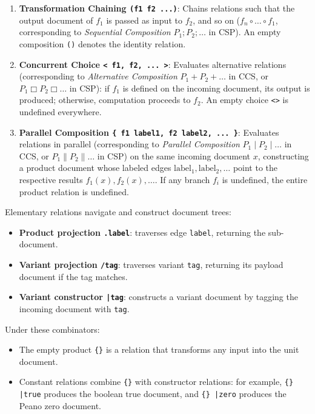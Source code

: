 \documentclass[11pt,a4paper]{article}
\begin{document}
\begin{enumerate}
  \item \textbf{Transformation Chaining \texttt{(f1 f2 ...)}}: Chains relations such that the output document of $f_1$ is passed as input to $f_2$, and so on ($f_n \circ \dots \circ f_1$, corresponding to \emph{Sequential Composition} $P_1 ; P_2 ; \dots$ in CSP). An empty composition \lstinline|()| denotes the identity relation.
  
  \item \textbf{Concurrent Choice \texttt{< f1, f2, ... >}}: Evaluates alternative relations (corresponding to \emph{Alternative Composition} $P_1 + P_2 + \dots$ in CCS, or $P_1 \Box P_2 \Box \dots$ in CSP): if $f_1$ is defined on the incoming document, its output is produced; otherwise, computation proceeds to $f_2$. An empty choice \lstinline|<>| is undefined everywhere.
  
  \item \textbf{Parallel Composition \texttt{\{ f1 label1, f2 label2, ... \}}}: Evaluates relations in parallel (corresponding to \emph{Parallel Composition} $P_1 \mid P_2 \mid \dots$ in CCS, or $P_1 \parallel P_2 \parallel \dots$ in CSP) on the same incoming document $x$, constructing a product document whose labeled edges $\text{label}_1, \text{label}_2, \dots$ point to the respective results $f_1(x), f_2(x), \dots$. If any branch $f_i$ is undefined, the entire product relation is undefined.
\end{enumerate}

Elementary relations navigate and construct document trees:
\begin{itemize}
  \item \textbf{Product projection \texttt{.label}}: traverses edge \lstinline|label|, returning the sub-document.
  \item \textbf{Variant projection \texttt{/tag}}: traverses variant \lstinline|tag|, returning its payload document if the tag matches.
  \item \textbf{Variant constructor \texttt{|tag}}: constructs a variant document by tagging the incoming document with \lstinline|tag|.
\end{itemize}

Under these combinators:
\begin{itemize}
  \item The empty product \lstinline|{}| is a relation that transforms any input into the unit document.
  \item Constant relations combine \lstinline|{}| with constructor relations: for example, \lstinline!{} |true! produces the boolean true document, and \lstinline!{} |zero! produces the Peano zero document.
\end{itemize}
\end{document}
